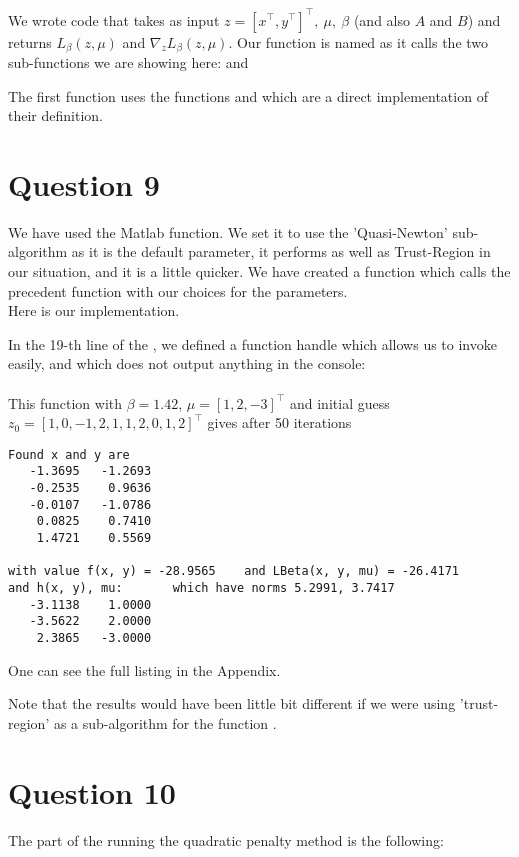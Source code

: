 \documentclass{article}
\newcommand{\tp}{^\top}
\begin{document}
We wrote code that takes as input $z = [x\tp, y\tp]\tp,\ \mu,\ \beta$ (and also $A$ and $B$) and returns $L_\beta(z, \mu)$ and $\nabla_z L_\beta(z, \mu)$.
Our function is named  as it calls the two sub-functions we are showing here:  and 






The first function uses the functions  and  which are a direct implementation of their definition.

\section*{Question 9}

We have used the Matlab  function. We set it to use the 'Quasi-Newton' sub-algorithm as it is the default parameter, it performs as well as Trust-Region in our situation, and it is a little quicker.
We have created a function  which calls the precedent function with our choices for the parameters.\\
Here is our implementation.



In the 19-th line of the , we defined a function handle which allows us to invoke  easily, and which does not output anything in the console:\\
\\
This function with $\beta = 1.42$, $\mu = [1, 2, -3]\tp$ and initial guess $z_0 = [1, 0, -1, 2, 1, 1, 2, 0, 1, 2]\tp$  gives after 50 iterations
\begin{lstlisting}
Found x and y are
   -1.3695   -1.2693
   -0.2535    0.9636
   -0.0107   -1.0786
    0.0825    0.7410
    1.4721    0.5569

with value f(x, y) = -28.9565    and LBeta(x, y, mu) = -26.4171
and h(x, y), mu:       which have norms 5.2991, 3.7417
   -3.1138    1.0000
   -3.5622    2.0000
    2.3865   -3.0000
\end{lstlisting}
One can see the full listing in the Appendix.

Note that the results would have been little bit different if we were using 'trust-region' as a sub-algorithm for the function .


\section*{Question 10}
The part of the  running the quadratic penalty method is the following:

\end{document}
